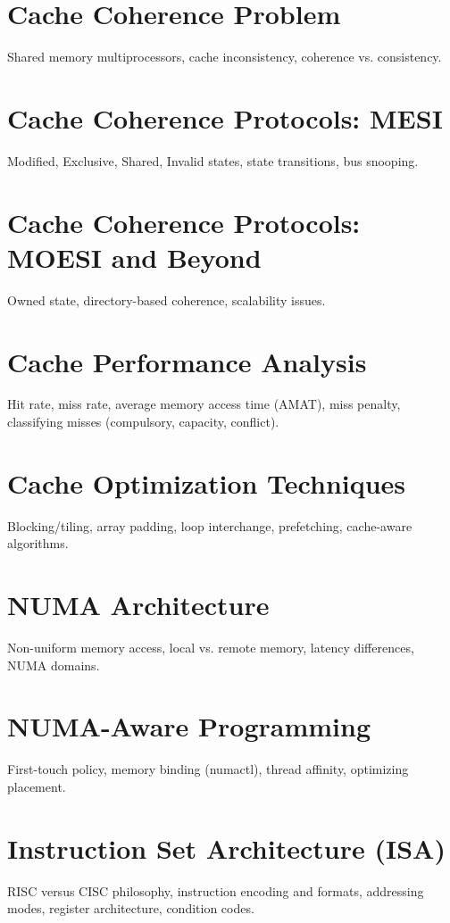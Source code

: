 \chapter{Cache Coherence Problem}
Shared memory multiprocessors, cache inconsistency, coherence vs. consistency.

\chapter{Cache Coherence Protocols: MESI}
Modified, Exclusive, Shared, Invalid states, state transitions, bus snooping.

\chapter{Cache Coherence Protocols: MOESI and Beyond}
Owned state, directory-based coherence, scalability issues.

\chapter{Cache Performance Analysis}
Hit rate, miss rate, average memory access time (AMAT), miss penalty, classifying misses (compulsory, capacity, conflict).

\chapter{Cache Optimization Techniques}
Blocking/tiling, array padding, loop interchange, prefetching, cache-aware algorithms.

\chapter{NUMA Architecture}
Non-uniform memory access, local vs. remote memory, latency differences, NUMA domains.

\chapter{NUMA-Aware Programming}
First-touch policy, memory binding (numactl), thread affinity, optimizing placement.


\chapter{Instruction Set Architecture (ISA)}
RISC versus CISC philosophy, instruction encoding and formats, addressing modes, register architecture, condition codes.

